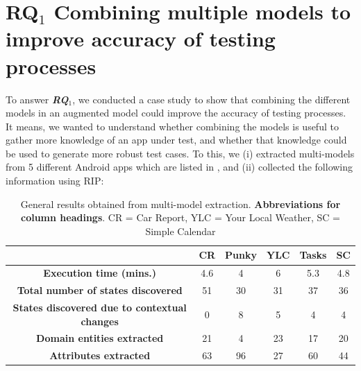 \section{\textbf{RQ$_1$} Combining multiple models to improve accuracy of testing processes}
To answer \textit{\textbf{RQ$_1$}}, we conducted a case study to show that combining the different models in an augmented model could improve the accuracy of testing processes. It means, we wanted to understand whether combining the models is useful to gather more knowledge of an app under test, and whether that knowledge could be used to generate more robust test cases. To this, we (i) extracted multi-models from 5 different Android apps which are listed in , and (ii) collected the following information using RIP:
\begin{table}[]
	\centering
	\caption{General results obtained from multi-model extraction. \textbf{Abbreviations for column headings}. CR = Car Report, YLC = Your Local Weather, SC = Simple Calendar}
	\label{experiment1}
	\begin{adjustbox}{width=\textwidth}
	\begin{tabular}{|c|c|c|c|c|c|}
		\hline
		& \textbf{CR \cite{carReport}} & \textbf{Punky} & \textbf{YLC \cite{localWeather}} & \textbf{Tasks \cite{tasks}} & \textbf{SC \cite{simpleCalendar}}\\ \hline
		\textbf{Execution time (mins.)} &       4.6              &          4            &           6             &     5.3           &         4.8                 \\ \hline
		\textbf{Total number of states discovered}         &         51            &           30           &      31                  &     37           &          36                \\ \hline
		\textbf{States discovered due to contextual changes}               &     0                &         8             &             5           &          4      &            4              \\ \hline
		\textbf{Domain entities extracted}               &       21              &           4           &           23             &       17         &             20             \\ \hline
		\textbf{Attributes extracted}               &       63              &            96          &             27           &         60       &                  44        \\ \hline
	\end{tabular}
\end{adjustbox}
\end{table}

